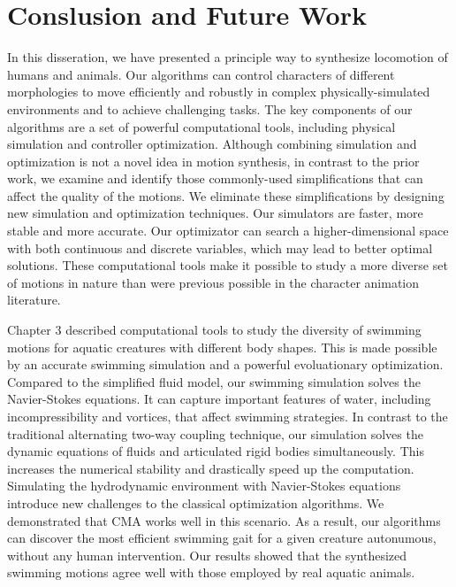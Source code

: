 \chapter{Conslusion and Future Work}

In this disseration, we have presented a principle way to synthesize locomotion of humans and animals. Our algorithms can control characters of different morphologies to move efficiently and robustly in complex physically-simulated environments and to achieve challenging tasks. The key components of our algorithms are a set of powerful computational tools, including physical simulation and controller optimization. Although combining simulation and optimization is not a novel idea in motion synthesis, in contrast to the prior work, we examine and identify those commonly-used simplifications that can affect the quality of the motions. We eliminate these simplifications by designing new simulation and optimization techniques. Our simulators are faster, more stable and more accurate. Our optimizator can search a higher-dimensional space with both continuous and discrete variables, which may lead to better optimal solutions. These computational tools make it possible to study a more diverse set of motions in nature than were previous possible in the character animation literature.

Chapter 3 described computational tools to study the diversity of swimming motions for aquatic creatures with different body shapes. This is made possible by an accurate swimming simulation and a powerful evoluationary optimization. Compared to the simplified fluid model, our swimming simulation solves the Navier-Stokes equations. It can capture important features of water, including incompressibility and vortices, that affect swimming strategies. In contrast to the traditional alternating two-way coupling technique, our simulation solves the dynamic equations of fluids and articulated rigid bodies simultaneously. This increases the numerical stability and drastically speed up the computation. Simulating the hydrodynamic environment with Navier-Stokes equations introduce new challenges to the classical optimization algorithms. We demonstrated that CMA works well in this scenario. As a result, our algorithms can discover the most efficient swimming gait for a given creature autonumous, without any human intervention. Our results showed that the synthesized swimming motions agree well with those employed by real aquatic animals.

